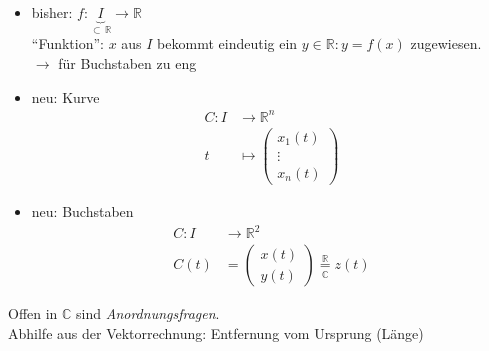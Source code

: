 \begin{note}[Achtung!]\flush

  \begin{itemize}
    \item bisher: $f: \underbrace{I}_{\subset \, \mathbb{R}} \longrightarrow \mathbb{R}$ \\
      "`Funktion"': $x$ aus $I$ bekommt eindeutig ein $y\in \mathbb{R}: y=f(x)$ zugewiesen.\\
      $\rightarrow$ für Buchstaben zu eng
    \item neu: Kurve
      \begin{align*}
      C:I & \longrightarrow \mathbb{R}^n \\
      t & \longmapsto \begin{pmatrix}x_1(t) \\ \vdots \\ x_n(t)\end{pmatrix}
      \end{align*}
    \item neu: Buchstaben
      \begin{align*}
      C:I & \longrightarrow \mathbb{R}^2 \\
      C(t) & = \begin{pmatrix}x(t) \\ y(t)\end{pmatrix} \underset{\mathbb{C}}{\overset{\mathbb{R}}{=}} z(t)
      \end{align*}
  \end{itemize}

\end{note}
%
\noindent Offen in $\mathbb{C}$ sind  \emph{Anordnungsfragen}.\\
Abhilfe aus der Vektorrechnung: Entfernung vom Ursprung (Länge)


